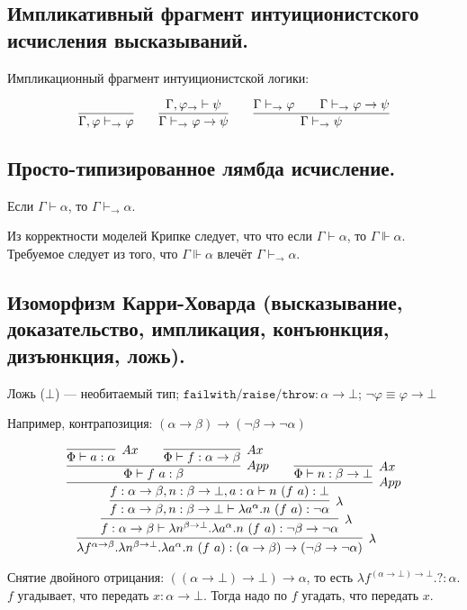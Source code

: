 \documentclass[10pt,a4paper,oneside]{article}
\begin{document}
\subsection{Импликативный фрагмент интуиционистского исчисления высказываний.}
  Импликационный фрагмент интуиционистской логики:

$$\infer{\Gamma,\varphi \vdash_\rightarrow \varphi}{} \quad\quad 
  \infer{\Gamma\vdash_\rightarrow\varphi\rightarrow\psi}{\Gamma,\varphi_\rightarrow\vdash\psi} \quad\quad 
  \infer{\Gamma\vdash_\rightarrow\psi}{\Gamma\vdash_\rightarrow\varphi\quad\quad\Gamma\vdash_\rightarrow\varphi\rightarrow\psi}$$


\subsection{Просто-типизированное лямбда исчисление.}
 Если $\Gamma\vdash\alpha$, то $\Gamma\vdash_\rightarrow\alpha$.

\noindent Из корректности моделей Крипке следует, что что если $\Gamma\vdash\alpha$, то $\Gamma\Vdash \alpha$.
Требуемое следует из того, что $\Gamma\Vdash \alpha$ влечёт $\Gamma\vdash_\rightarrow\alpha$.

\subsection{Изоморфизм Карри-Ховарда (высказывание, доказательство, импликация, конъюнкция, дизъюнкция, ложь).}

  Ложь ($\bot$) --- необитаемый тип;
$\texttt{failwith/raise/throw} : \alpha\rightarrow\bot$; $\neg\varphi\equiv\varphi\rightarrow\bot$


\noindent Например, контрапозиция:
$(\alpha\rightarrow\beta)\rightarrow(\neg\beta\rightarrow\neg\alpha)$

$$\infer[\lambda]{\lambda f^{\alpha\rightarrow\beta}.\lambda n^{\beta\rightarrow\bot}.\lambda a^\alpha.n\ (f\ a): (\alpha\rightarrow\beta)\rightarrow(\neg\beta\rightarrow\neg\alpha)}
        {\infer[\lambda]{f:\alpha\rightarrow\beta\vdash\lambda n^{\beta\rightarrow\bot}.\lambda a^\alpha.n\ (f\ a): \neg\beta\rightarrow\neg\alpha}
               {\infer[\lambda]{f:\alpha\rightarrow\beta,n:\beta\rightarrow\bot\vdash\lambda a^\alpha.n\ (f\ a): \neg\alpha}{
                       \infer[App]{f:\alpha\rightarrow\beta,n:\beta\rightarrow\bot, a:\alpha \vdash n\ (f\ a): \bot}{
                              \infer[App]{\Phi \vdash f\ a: \beta}{\infer[Ax]{\Phi \vdash a: \alpha}{}\quad\quad\infer[Ax]{\Phi \vdash f:\alpha\rightarrow\beta}{}}
    \quad\quad \infer[Ax]{\Phi \vdash n: \beta\rightarrow\bot}{}
               }
               }}}$$

Снятие двойного отрицания: $((\alpha\rightarrow\bot)\rightarrow\bot)\rightarrow\alpha$, то есть $\lambda f^{(\alpha\rightarrow\bot)\rightarrow\bot}.?: \alpha$.\\
$f$ угадывает, что передать $x: \alpha\rightarrow\bot$. Тогда надо по $f$ угадать, что передать $x$.
\end{document}
